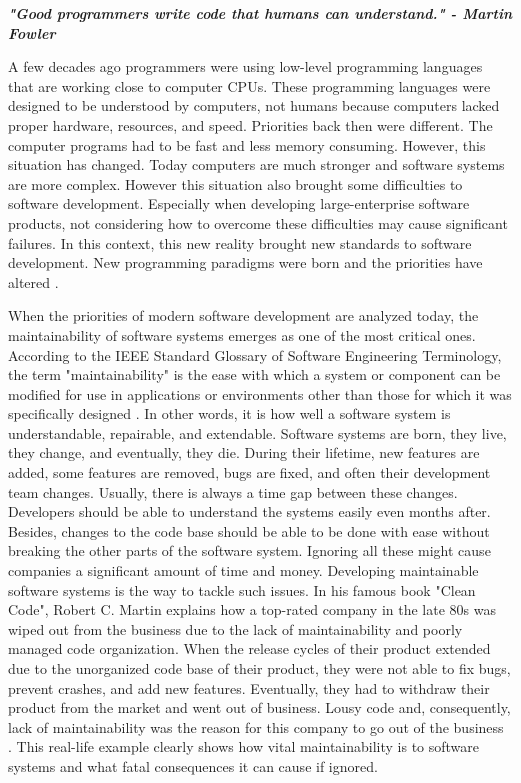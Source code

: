\textbf{\textit{"Good programmers write code that humans can understand." - Martin Fowler}} \cite{21}

A few decades ago programmers were using low-level programming languages that are working close to computer CPUs. These programming languages were designed to be understood by computers, not humans because computers lacked proper hardware, resources, and speed. Priorities back then were different. The computer programs had to be fast and less memory consuming. However, this situation has changed. Today computers are much stronger and software systems are more complex. However this situation also brought some difficulties to software development. Especially when developing large-enterprise software products, not considering how to overcome these difficulties may cause significant failures. In this context,  this new reality brought new standards to software development. New programming paradigms were born and the priorities have altered \cite{12}.

When the priorities of modern software development are analyzed today, the maintainability of software systems emerges as one of the most critical ones. According to the IEEE Standard Glossary of Software Engineering Terminology, the term "maintainability" is the ease with which a system or component can be modified for use in applications or environments other than those for which it was specifically designed \cite{20}. In other words, it is how well a software system is understandable, repairable, and extendable. Software systems are born, they live, they change, and eventually, they die. During their lifetime, new features are added, some features are removed, bugs are fixed, and often their development team changes. Usually, there is always a time gap between these changes. Developers should be able to understand the systems easily even months after. Besides, changes to the code base should be able to be done with ease without breaking the other parts of the software system. Ignoring all these might cause companies a significant amount of time and money. Developing maintainable software systems is the way to tackle such issues. In his famous book "Clean Code", Robert C. Martin explains how a top-rated company in the late 80s was wiped out from the business due to the lack of maintainability and poorly managed code organization. When the release cycles of their product extended due to the unorganized code base of their product, they were not able to fix bugs, prevent crashes, and add new features. Eventually, they had to withdraw their product from the market and went out of business. Lousy code and, consequently, lack of maintainability was the reason for this company to go out of the business \cite{11}. This real-life example clearly shows how vital maintainability is to software systems and what fatal consequences it can cause if ignored. 

